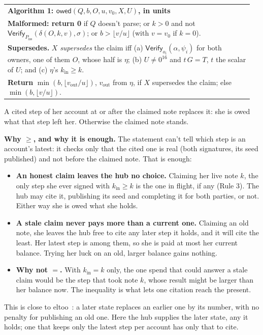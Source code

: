 \documentclass[11pt]{article}
\theoremstyle{plain}
\theoremstyle{definition}
\newcommand{\Vfy}{\mathsf{Verify}}
\newcommand{\Piss}{P_{\mathrm{iss}}}
\newcommand{\owed}{\mathsf{owed}}
\newcommand{\kin}{k_{\mathrm{in}}}
\newcommand{\vout}{v_{\mathrm{out}}}
\newenvironment{algobox}[1]
  {\par\smallskip\noindent\begin{tabular}{|p{0.955\linewidth}|}\hline\textbf{#1}\\[2pt]}
  {\\\hline\end{tabular}\par\smallskip}
\begin{document}
\begin{algobox}{Algorithm 1: $\owed(Q, b, O, u, v_0, X, U)$, in units}
\textbf{Malformed: return 0} if $Q$ doesn't parse; or $k > 0$ and not
$\Vfy_{\Piss}(\delta(O, k, v), \sigma)$; or $b > \lfloor v/u \rfloor$
(with $v = v_0$ if $k = 0$).\\[3pt]
\textbf{Supersedes.} $X$ \emph{supersedes} the claim iff
(a) $\Vfy_{o_i}(\alpha, \psi_i)$ for both owners, one of them $O$, whose
half is $\eta$;
(b) $U \ne 0^{16}$ and $t\,G = T$, $t$ the scalar of $U$; and
(c) $\eta$'s $\kin \ge k$.\\[3pt]
\textbf{Return} $\min(b, \lfloor \vout/u \rfloor)$, $\vout$ from $\eta$,
if $X$ supersedes the claim; else $\min(b, \lfloor v/u \rfloor)$.
\end{algobox}

A cited step of her account at or after the claimed note replaces it:
she is owed what that step left her. Otherwise the claimed note stands.

\textbf{Why $\ge$, and why it is enough.} The statement can't tell
which step is an account's latest: it checks only that the cited one is
real (both signatures, its seed published) and not before the claimed
note. That is enough:
\begin{itemize}[nosep]
\item \textbf{An honest claim leaves the hub no choice.} Claiming her
  live note $k$, the only step she ever signed with $\kin \ge k$ is the
  one in flight, if any (Rule 3). The hub may cite it, publishing its
  seed and completing it for both parties, or not. Either way she is
  owed what she holds.
\item \textbf{A stale claim never pays more than a current one.} Claiming
  an old note, she leaves the hub free to cite any later step it holds,
  and it will cite the least. Her latest step is among them, so she is
  paid at most her current balance. Trying her luck on an old, larger
  balance gains nothing.
\item \textbf{Why not $=$.} With $\kin = k$ only, the one spend that
  could answer a stale claim would be the step that took note $k$,
  whose result might be larger than her balance now. The inequality is
  what lets one citation reach the present.
\end{itemize}
This is close to eltoo~\cite{eltoo}: a later state replaces an earlier
one by its number, with no penalty for publishing an old one. Here the
hub supplies the later state, any it holds; one that keeps only the
latest step per account has only that to cite.
\end{document}
